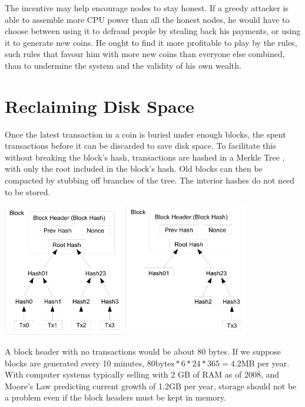 \documentclass[10pt]{book}
\begin{document}
The incentive may help encourage nodes to stay honest.
If a greedy attacker is able to assemble more CPU power than all the honest nodes, he would have to choose between using it to defraud people by stealing back his payments, or using it to generate new coins.
He ought to find it more profitable to play by the rules, such rules that favour him with more new coins than everyone else combined, than to undermine the system and the validity of his own wealth.

\chapter{Reclaiming Disk Space}
Once the latest transaction in a coin is buried under enough blocks, the spent transactions before it can be discarded to save disk space.
To facilitate this without breaking the block's hash, transactions are hashed in a Merkle Tree \cite{Merkle,Massias,Haber3}, with only the root included in the block's hash.
Old blocks can then be compacted by stubbing off branches of the tree.
The interior hashes do not need to be stored.

\begin{center}
\includegraphics[width=0.4\textwidth]{./images/3a.png}
\includegraphics[width=0.4\textwidth]{./images/3b.png}
\end{center}

A block header with no transactions would be about 80 bytes.
If we suppose blocks are generated every 10 minutes, \(80 \text{bytes} * 6 * 24 * 365 = 4.2\text{MB}\) per year.
With computer systems typically selling with 2 GB of RAM as of 2008, and Moore's Law predicting current growth of 1.2GB per year, storage should not be a problem even if the block headers must be kept in memory.
\end{document}

